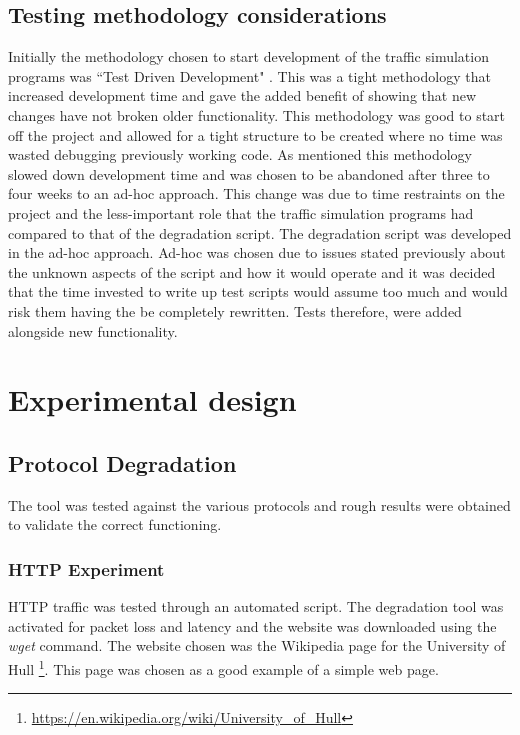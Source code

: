\subsection{Testing methodology considerations}
Initially the methodology chosen to start development of the traffic simulation programs was ``Test Driven Development" \citep{beck2003test}. This was a tight methodology that increased development time and gave the added benefit of showing that new changes have not broken older functionality. This methodology was good to start off the project and allowed for a tight structure to be created where no time was wasted debugging previously working code. As mentioned this methodology slowed down development time and was chosen to be abandoned after three to four weeks to an ad-hoc approach. 
This change was due to time restraints on the project and the less-important role that the traffic simulation programs had compared to that of the degradation script. The degradation script was developed in the ad-hoc approach. Ad-hoc was chosen due to issues stated previously about the unknown aspects of the script and how it would operate and it was decided that the time invested to write up test scripts would assume too much and would risk them having the be completely rewritten. Tests therefore, were added alongside new functionality.





%
\section{Experimental design}

\subsection{Protocol Degradation}
The tool was tested against the various protocols and rough results were obtained to validate the correct functioning.

\subsubsection{HTTP Experiment}
HTTP traffic was tested through an automated script. The degradation tool was activated for packet loss and latency and the website was downloaded using the {\it wget} command. The website chosen was the Wikipedia page for the University of Hull \footnote{\url{https://en.wikipedia.org/wiki/University_of_Hull}}. This page was chosen as a good example of a simple web page.

